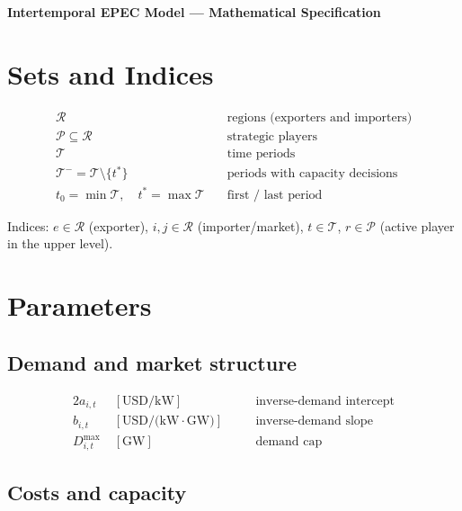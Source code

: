 \documentclass[11pt]{article}
\newcommand{\R}{\mathcal{R}}
\newcommand{\T}{\mathcal{T}}
\newcommand{\PP}{\mathcal{P}}
\newcommand{\Tminus}{\mathcal{T}^{-}}
\newcommand{\tmin}{t_{0}}
\newcommand{\tmax}{t^{*}}
\begin{document}
\begin{center}
{\Large\bfseries Intertemporal EPEC Model --- Mathematical Specification}
\end{center}

\section{Sets and Indices}

\begin{align*}
  \R          &\quad\text{regions (exporters and importers)}  \\
  \PP\subseteq\R &\quad\text{strategic players}                \\
  \T          &\quad\text{time periods}                       \\
  \Tminus = \T\setminus\{\tmax\}
              &\quad\text{periods with capacity decisions}    \\
  \tmin = \min\T,\quad \tmax = \max\T
              &\quad\text{first / last period}
\end{align*}

Indices: $e\in\R$ (exporter), $i,j\in\R$ (importer/market),
$t\in\T$, $r\in\PP$ (active player in the upper level).

\section{Parameters}

\subsection*{Demand and market structure}

\begin{alignat*}{2}
  a_{i,t}         &\;[\text{USD/kW}]
    &&\quad\text{inverse-demand intercept}          \\
  b_{i,t}         &\;[\text{USD/(kW$\cdot$GW)}]
    &&\quad\text{inverse-demand slope}               \\
  D^{\max}_{i,t}  &\;[\text{GW}]
    &&\quad\text{demand cap}
\end{alignat*}

\subsection*{Costs and capacity}
\end{document}
